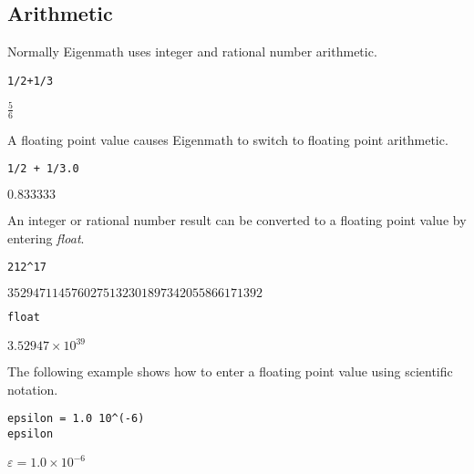 \subsection{Arithmetic}

\noindent
Normally Eigenmath uses integer and rational number arithmetic.

\begin{Verbatim}[formatcom=\color{blue}]
1/2+1/3
\end{Verbatim}

\noindent
$\displaystyle \tfrac{5}{6}$

\bigskip
\noindent
A floating point value causes Eigenmath to switch to floating point arithmetic.

\begin{Verbatim}[formatcom=\color{blue}]
1/2 + 1/3.0
\end{Verbatim}

\noindent
$\displaystyle 0.833333$

\bigskip
\noindent
An integer or rational number result can be converted to a floating
point value by entering {\it float}.

\begin{Verbatim}[formatcom=\color{blue}]
212^17
\end{Verbatim}

\noindent
$\displaystyle 3529471145760275132301897342055866171392$

\begin{Verbatim}[formatcom=\color{blue}]
float
\end{Verbatim}

\noindent
$\displaystyle 3.52947\times10^{39}$

\bigskip
\noindent
The following example shows how to enter a floating point value
using scientific notation.

\begin{Verbatim}[formatcom=\color{blue}]
epsilon = 1.0 10^(-6)
epsilon
\end{Verbatim}

\noindent
$\displaystyle \varepsilon=1.0\times10^{-6}$
